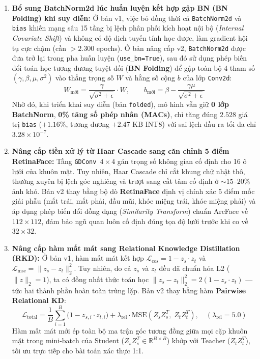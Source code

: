 \documentclass[11pt,a4paper]{article}
\begin{document}
\begin{enumerate}
    \item \textbf{Bổ sung BatchNorm2d lúc huấn luyện kết hợp gập BN (BN Folding) khi suy diễn:}
    Ở bản v1, việc bỏ đồng thời cả \texttt{BatchNorm2d} và \texttt{bias} khiến mạng sâu 15 tầng bị lệch phân phối kích hoạt nội bộ (\textit{Internal Covariate Shift}) và không có độ dịch tuyến tính học được, làm gradient hội tụ cực chậm (cần $>2.300$ epochs).
    Ở bản nâng cấp v2, \texttt{BatchNorm2d} được đưa trở lại trong pha huấn luyện (\texttt{use\_bn=True}), sau đó sử dụng phép biến đổi toán học tương đương tuyệt đối (\textbf{BN Folding}) để gập toàn bộ 4 tham số $(\gamma, \beta, \mu, \sigma^2)$ vào thẳng trọng số $W$ và hằng số cộng $b$ của lớp \texttt{Conv2d}:
    \begin{equation}
    W_{\text{mới}} = \frac{\gamma}{\sqrt{\sigma^2 + \epsilon}} \cdot W, \qquad
    b_{\text{mới}} = \beta - \frac{\gamma \mu}{\sqrt{\sigma^2 + \epsilon}}
    \end{equation}
    Nhờ đó, khi triển khai suy diễn (bản \texttt{folded}), mô hình vẫn giữ \textbf{0 lớp BatchNorm}, \textbf{0\% tăng số phép nhân (MACs)}, chỉ tăng đúng $2.528$ giá trị \texttt{bias} ($+1.16\%$, tương đương $+2.47\text{ KB}$ INT8) với sai lệch đầu ra tối đa chỉ $3.28 \times 10^{-7}$.

    \item \textbf{Nâng cấp tiền xử lý từ Haar Cascade sang căn chỉnh 5 điểm RetinaFace:}
    Tầng \texttt{GDConv $4 \times 4$} gán trọng số không gian cố định cho 16 ô lưới của khuôn mặt. Tuy nhiên, Haar Cascade chỉ cắt khung chữ nhật thô, thường xuyên bị lệch góc nghiêng và trượt sang cắt tâm cố định ở $\sim 15\text{--}20\%$ ảnh khó. Bản v2 thay bằng bộ dò \textbf{RetinaFace} định vị chính xác 5 điểm mốc giải phẫu (mắt trái, mắt phải, đầu mũi, khóe miệng trái, khóe miệng phải) và áp dụng phép biến đổi đồng dạng (\textit{Similarity Transform}) chuẩn ArcFace về $112 \times 112$, đảm bảo ngũ quan luôn cố định đúng tọa độ lưới trước khi co về $32 \times 32$.

    \item \textbf{Nâng cấp hàm mất mát sang Relational Knowledge Distillation (RKD):}
    Ở bản v1, hàm mất mát kết hợp $\mathcal{L}_{\text{cos}} = 1 - z_s \cdot z_t$ và $\mathcal{L}_{\text{mse}} = \|z_s - z_t\|_2^2$. Tuy nhiên, do cả $z_s$ và $z_t$ đều đã chuẩn hóa L2 ($\|z\|_2 = 1$), ta có đồng nhất thức toán học $\|z_s - z_t\|_2^2 = 2(1 - z_s \cdot z_t)$ — tức hai thành phần hoàn toàn trùng lặp. Bản v2 thay bằng hàm \textbf{Pairwise Relational KD}:
    \begin{equation}
    \mathcal{L}_{\text{total}} = \frac{1}{B}\sum_{i=1}^{B}\bigl(1 - z_{s,i} \cdot z_{t,i}\bigr) + \lambda_{\text{rel}} \cdot \text{MSE}\!\left(Z_s Z_s^T,\; Z_t Z_t^T\right), \quad (\lambda_{\text{rel}} = 5.0)
    \end{equation}
    Hàm mất mát mới ép toàn bộ ma trận góc tương đồng giữa mọi cặp khuôn mặt trong mini-batch của Student ($Z_s Z_s^T \in \mathbb{R}^{B \times B}$) khớp với Teacher ($Z_t Z_t^T$), tối ưu trực tiếp cho bài toán xác thực 1:1.


\end{enumerate}
\end{document}
